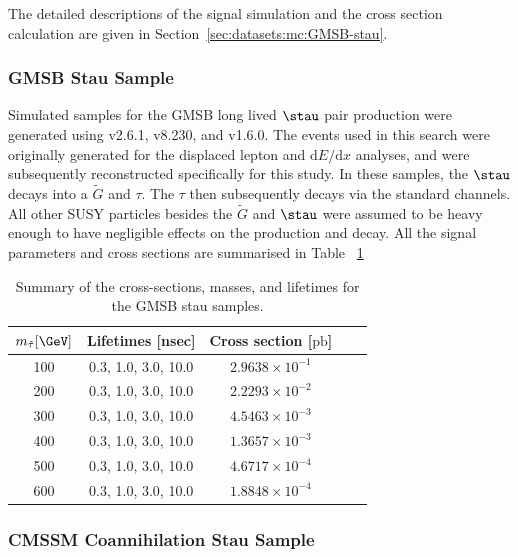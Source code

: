 The detailed descriptions of the signal simulation and the cross section calculation are given in Section~\ref{sec:datasets:mc:GMSB-stau}.


\subsubsection{GMSB Stau Sample}
\label{sec:datasets:mc:GMSB_stau}

Simulated samples for the GMSB long lived $\stau$ pair production were generated using \MGNLO v2.6.1, \PYTHIA v8.230, and \EVTGEN v1.6.0.
The events used in this search were originally generated for the displaced lepton and $\text{d}E/\text{d}x$ analyses, and were subsequently reconstructed specifically for this study.
In these samples, the $\stau$ decays into a $\tilde{G}$ and $\tau$.
The $\tau$ then subsequently decays via the standard channels.
All other SUSY particles besides the $\tilde{G}$ and $\stau$ were assumed to be heavy enough to have negligible effects on the production and decay.
All the signal parameters and cross sections are summarised in Table ~\ref{tab:xsec_stauGMSB}

\begin{table}[htbp]
	\centering
	\caption{Summary of the cross-sections, masses, and lifetimes for the GMSB stau samples.}
	\begin{tabular}{ccccc}
		\hline
		\hline
		$m_{\tilde{\tau}}[\GeV]$ & Lifetimes [nsec] & Cross section [$\mathrm{pb}$] \\
		\hline
		100  & 0.3, 1.0, 3.0, 10.0 & $2.9638 \times 10^{-1}$    \\
		200  & 0.3, 1.0, 3.0, 10.0 & $2.2293 \times 10^{-2}$    \\
		300  & 0.3, 1.0, 3.0, 10.0 & $4.5463 \times 10^{-3}$    \\
		400  & 0.3, 1.0, 3.0, 10.0 & $1.3657 \times 10^{-3}$    \\
		500  & 0.3, 1.0, 3.0, 10.0 & $4.6717 \times 10^{-4}$  \\
		600  & 0.3, 1.0, 3.0, 10.0 & $1.8848 \times 10^{-4}$  \\
		\hline
		\hline
	\end{tabular}
	\label{tab:xsec_stauGMSB}
\end{table}


\subsubsection{CMSSM Coannihilation Stau Sample}
\label{sec:datasets:mc:CMSSM_stau}

